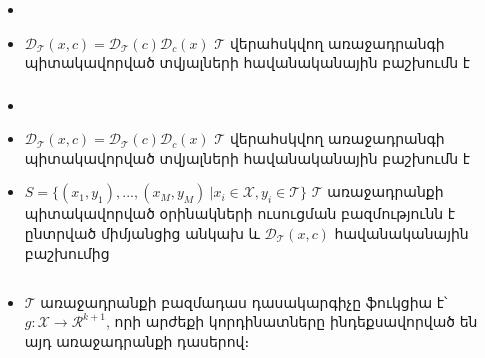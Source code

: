 \documentclass[10pt]{beamer}
\begin{document}
\begin{frame}[t]
\frametitle{}
\begin{itemize}
\vspace{5mm}
\item  {}

\item $\mathcal{D}_{\mathcal{T}}(x, c) = \mathcal{D}_{\mathcal{T}}(c)\mathcal{D}_{c}(x)$ $\mathcal{T}$ վերահսկվող առաջադրանգի պիտակավորված տվյալների հավանականային բաշխումն է

\end{itemize}
\end{frame}



\begin{frame}[t]
\frametitle{}
\begin{itemize}
\vspace{5mm}
\item  {}

\item $\mathcal{D}_{\mathcal{T}}(x, c) = \mathcal{D}_{\mathcal{T}}(c)\mathcal{D}_{c}(x)$ $\mathcal{T}$ վերահսկվող առաջադրանգի պիտակավորված տվյալների հավանականային բաշխումն է

\item $S = \{(x_1, y_1), ..., (x_M, y_M) \ | x_i \in \mathcal{X}, y_i \in \mathcal{T}\}$ $\mathcal{T}$ առաջադրանքի պիտակավորված օրինակների ուսուցման բազմությունն է ընտրված միմյանցից անկախ և $\mathcal{D}_{\mathcal{T}}(x, c)$ հավանականային բաշխումից
\end{itemize}
\end{frame}

\subsection{}


\begin{frame}[t]
\frametitle{}
\end{frame}


\begin{frame}[t]
\frametitle{}
\begin{itemize}
\vspace{5mm}
\item \armfont $\mathcal{T}$ առաջադրանքի բազմադաս դասակարգիչը ֆուկցիա է՝ $g:\mathcal{X} \rightarrow \mathcal{R}^{k+1}$, որի արժեքի կորդինատները ինդեքսավորված են այդ առաջադրանքի դասերով։
\end{itemize}
\end{frame}
\end{document}
